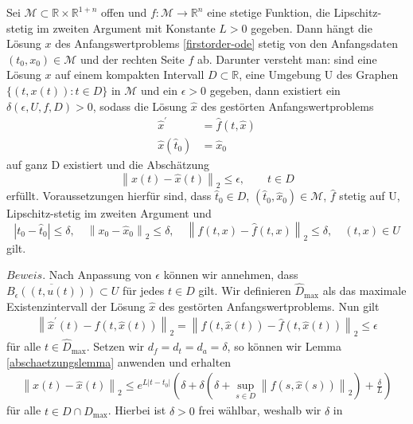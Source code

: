 \begin{satz}
    \label{Satz-stet-abh}
    Sei $\mathcal{M} \subset \mathbb{R} \times \mathbb{R}^{1+n}$ offen und $f:\mathcal{M} \rightarrow \mathbb{R}^{n}$
    eine stetige Funktion, die Lipschitz-stetig im zweiten Argument mit Konstante $L>0$ gegeben. Dann hängt die
    Lösung $x$ des Anfangswertproblems \eqref{firstorder-ode} stetig von den Anfangsdaten $(t_0, x_0) \in \mathcal{M}$
    und der rechten Seite $f$ ab. Darunter versteht man:
    sind eine Lösung $x$ auf einem kompakten Intervall $D \subset \mathbb{R}$, eine Umgebung U des Graphen
    $\{(t,x(t)): t \in D\}$ in $\mathcal{M}$ und ein $\epsilon>0$ gegeben, dann existiert ein
    $\delta(\epsilon, U, f, D) >0$, sodass die Lösung $\hat{x}$ des gestörten Anfangswertproblems
    \begin{align*}
        \hat{x}^{\prime} &= \hat{f}(t,\hat{x})\\
        \hat{x}(\hat{t}_0) &= \hat{x}_0
    \end{align*}
    auf ganz D existiert und die Abschätzung
    \[
        \left\lVert x(t) - \hat{x}(t) \right\rVert_2 \leq \epsilon, \qquad t \in D
    \]
    erfüllt. Voraussetzungen hierfür sind, dass $\hat{t}_0 \in D$, $(\hat{t}_0, \hat{x}_0) \in \mathcal{M}$, $\hat{f}$
    stetig auf U, Lipschitz-stetig im zweiten Argument und
    \[
        |t_0 - \hat{t}_0| \leq \delta, \quad \left\lVert x_0 - \hat{x}_0 \right\rVert_2 \leq \delta, \quad
        \left\lVert f(t,x) - \hat{f}(t,x) \right\rVert_2 \leq \delta, \quad (t,x) \in U
    \] gilt.
\end{satz}
$Beweis.$ Nach Anpassung von $\epsilon$ können wir annehmen, dass $\overline{B_{\epsilon}((t, u(t)))} \subset U$ für
jedes $t \in D$ gilt. Wir definieren $\hat{D}_{\text{max}}$ als das maximale Existenzintervall der Lösung $\hat{x}$ des
gestörten Anfangswertproblems. Nun gilt
\begin{align*}
    \left\lVert \hat{x}^{\prime}(t) - f(t, \hat{x}(t)) \right\rVert_2 =
    \left\lVert f(t,\hat{x}(t)) - \hat{f}(t, \hat{x}(t)) \right\rVert_2 \leq \epsilon
\end{align*}
für alle $t \in \hat{D}_{\text{max}}$. Setzen wir $d_f = d_t = d_a = \delta$, so können wir Lemma
\ref{abschaetzungslemma} anwenden und erhalten
\begin{align*}
    \left\lVert x(t) - \hat{x}(t)\right\rVert_2 \leq e^{L|t-t_0|}(\delta + \delta(\delta +
    \sup\limits_{s \in D}\left\lVert f(s,\hat{x}(s))\right\rVert_2) + \frac{\delta}{L})
\end{align*}
für alle $t \in D \cap \hat{D}_{\text{max}}$. Hierbei ist $\delta > 0$ frei wählbar, weshalb wir $\delta$ in
